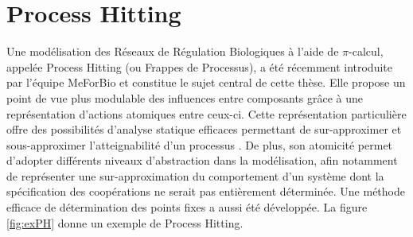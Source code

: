 \section{Process Hitting}\label{sec:PH}
Une modélisation des Réseaux de Régulation Biologiques à l'aide de $\pi$-calcul, appelée Process Hitting (ou Frappes de Processus), a été récemment introduite par l'équipe MeForBio \cite{PMR10-TCSB,PaulevePhD} et constitue le sujet central de cette thèse.
Elle propose un point de vue plus modulable des influences entre composants grâce à une représentation d'actions atomiques entre ceux-ci.
Cette représentation particulière offre des possibilités d'analyse statique efficaces permettant de sur-approximer et sous-approximer l'atteignabilité d'un processus \cite{PMR12-MSCS}.
De plus, son atomicité permet d'adopter différents niveaux d'abstraction dans la modélisation, afin notamment de représenter une sur-approximation du comportement d'un système dont la spécification des coopérations ne serait pas entièrement déterminée.
Une méthode efficace de détermination des points fixes a aussi été développée.
La figure \ref{fig:exPH} donne un exemple de Process Hitting.

